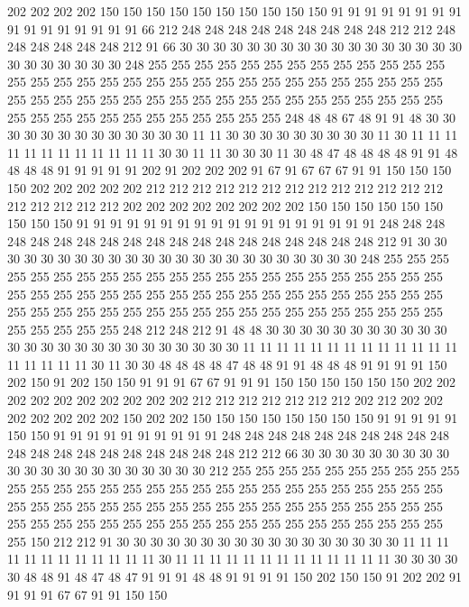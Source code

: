 202 202 202 202 150 150 150 150 150 150 150 150 150 150 91 91 91 91 91 91
91 91 91 91 91 91 91 91 91 91 66 212 248 248 248 248 248 248 248 248
248 212 212 248 248 248 248 248 248 212 91 66 30 30 30 30 30 30 30 30
30 30 30 30 30 30 30 30 30 30 30 30 30 30 30 30 248 255 255 255
255 255 255 255 255 255 255 255 255 255 255 255 255 255 255 255 255 255 255 255
255 255 255 255 255 255 255 255 255 255 255 255 255 255 255 255 255 255 255 255
255 255 255 255 255 255 255 255 255 255 255 255 255 255 255 255 255 255 255 255
248 48 48 67 48 91 91 48 30 30 30 30 30 30 30 30 30 30 30 30
30 11 11 30 30 30 30 30 30 30 30 30 11 30 11 11 11 11 11 11
11 11 11 11 11 11 30 30 11 11 30 30 30 11 30 48 47 48 48 48
48 91 91 48 48 48 48 91 91 91 91 91 202 91 202 202 202 91 67 91
67 67 67 91 91 150 150 150 150 202 202 202 202 202 212 212 212 212 212 212
212 212 212 212 212 212 212 212 212 212 212 212 202 202 202 202 202 202 202 202
150 150 150 150 150 150 150 150 150 91 91 91 91 91 91 91 91 91 91 91
91 91 91 91 91 91 91 248 248 248 248 248 248 248 248 248 248 248 248 248
248 248 248 248 248 248 212 91 30 30 30 30 30 30 30 30 30 30 30 30
30 30 30 30 30 30 30 30 30 30 30 248 255 255 255 255 255 255 255 255
255 255 255 255 255 255 255 255 255 255 255 255 255 255 255 255 255 255 255 255
255 255 255 255 255 255 255 255 255 255 255 255 255 255 255 255 255 255 255 255
255 255 255 255 255 255 255 255 255 255 255 255 255 255 255 255 255 248 212 248
212 91 48 48 30 30 30 30 30 30 30 30 30 30 30 30 30 30 30 30
30 30 30 30 30 30 30 30 30 11 11 11 11 11 11 11 11 11 11 11
11 11 11 11 11 11 11 30 11 30 30 48 48 48 48 47 48 48 91 91
48 48 48 91 91 91 91 150 202 150 91 202 150 150 91 91 91 67 67 91
91 91 150 150 150 150 150 150 202 202 202 202 202 202 202 202 202 202 212 212
212 212 212 212 212 202 212 202 202 202 202 202 202 202 150 202 202 150 150 150
150 150 150 150 150 91 91 91 91 91 150 150 91 91 91 91 91 91 91 91
91 91 248 248 248 248 248 248 248 248 248 248 248 248 248 248 248 248 248 248
248 248 212 212 66 30 30 30 30 30 30 30 30 30 30 30 30 30 30 30
30 30 30 30 30 30 212 255 255 255 255 255 255 255 255 255 255 255 255 255
255 255 255 255 255 255 255 255 255 255 255 255 255 255 255 255 255 255 255 255
255 255 255 255 255 255 255 255 255 255 255 255 255 255 255 255 255 255 255 255
255 255 255 255 255 255 255 255 255 255 255 255 255 255 255 150 212 212 91 30
30 30 30 30 30 30 30 30 30 30 30 30 30 30 30 30 11 11 11 11
11 11 11 11 11 11 11 11 30 11 11 11 11 11 11 11 11 11 11 11
11 11 30 30 30 30 30 48 48 91 48 47 48 47 91 91 91 48 48 91
91 91 91 150 202 150 150 91 202 202 91 91 91 91 67 67 91 91 150 150
